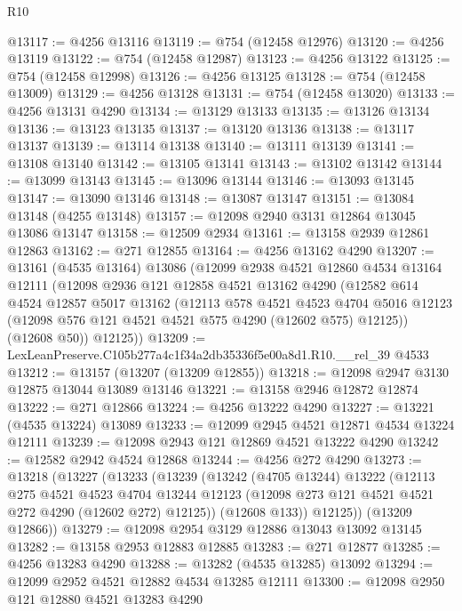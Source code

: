 \begin{lexlean}{R10}
\begin{coremodule}
@13117 := @4256 @13116
@13119 := @754 (@12458 @12976)
@13120 := @4256 @13119
@13122 := @754 (@12458 @12987)
@13123 := @4256 @13122
@13125 := @754 (@12458 @12998)
@13126 := @4256 @13125
@13128 := @754 (@12458 @13009)
@13129 := @4256 @13128
@13131 := @754 (@12458 @13020)
@13133 := @4256 @13131 @4290
@13134 := @13129 @13133
@13135 := @13126 @13134
@13136 := @13123 @13135
@13137 := @13120 @13136
@13138 := @13117 @13137
@13139 := @13114 @13138
@13140 := @13111 @13139
@13141 := @13108 @13140
@13142 := @13105 @13141
@13143 := @13102 @13142
@13144 := @13099 @13143
@13145 := @13096 @13144
@13146 := @13093 @13145
@13147 := @13090 @13146
@13148 := @13087 @13147
@13151 := @13084 @13148 (@4255 @13148)
@13157 := @12098 @2940 @3131 @12864 @13045 @13086 @13147
@13158 := @12509 @2934
@13161 := @13158 @2939 @12861 @12863
@13162 := @271 @12855
@13164 := @4256 @13162 @4290
@13207 := @13161
    (@4535 @13164)
    @13086
    (@12099
      @2938
      @4521
      @12860
      @4534
      @13164
      @12111
      (@12098
        @2936
        @121
        @12858
        @4521
        @13162
        @4290
        (@12582
          @614
          @4524
          @12857
          @5017
          @13162
          (@12113
            @578
            @4521
            @4523
            @4704
            @5016
            @12123
            (@12098 @576 @121 @4521 @4521 @575 @4290 (@12602 @575) @12125))
          (@12608 @50))
        @12125))
@13209 := LexLeanPreserve.C105b277a4c1f34a2db35336f5e00a8d1.R10.__rel_39 @4533
@13212 := @13157 (@13207 (@13209 @12855))
@13218 := @12098 @2947 @3130 @12875 @13044 @13089 @13146
@13221 := @13158 @2946 @12872 @12874
@13222 := @271 @12866
@13224 := @4256 @13222 @4290
@13227 := @13221 (@4535 @13224) @13089
@13233 := @12099 @2945 @4521 @12871 @4534 @13224 @12111
@13239 := @12098 @2943 @121 @12869 @4521 @13222 @4290
@13242 := @12582 @2942 @4524 @12868
@13244 := @4256 @272 @4290
@13273 := @13218
    (@13227
      (@13233
        (@13239
          (@13242
            (@4705 @13244)
            @13222
            (@12113
              @275
              @4521
              @4523
              @4704
              @13244
              @12123
              (@12098 @273 @121 @4521 @4521 @272 @4290 (@12602 @272) @12125))
            (@12608 @133))
          @12125))
      (@13209 @12866))
@13279 := @12098 @2954 @3129 @12886 @13043 @13092 @13145
@13282 := @13158 @2953 @12883 @12885
@13283 := @271 @12877
@13285 := @4256 @13283 @4290
@13288 := @13282 (@4535 @13285) @13092
@13294 := @12099 @2952 @4521 @12882 @4534 @13285 @12111
@13300 := @12098 @2950 @121 @12880 @4521 @13283 @4290

\end{coremodule}
\end{lexlean}
